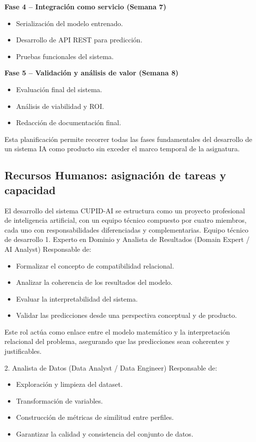 \textbf{Fase 4 – Integración como servicio (Semana 7)}
\begin{itemize}
    \item Serialización del modelo entrenado.
    \item Desarrollo de API REST para predicción.
    \item Pruebas funcionales del sistema.
\end{itemize}

\textbf{Fase 5 – Validación y análisis de valor (Semana 8)}
\begin{itemize}
    \item Evaluación final del sistema.
    \item Análisis de viabilidad y ROI.
    \item Redacción de documentación final.
\end{itemize}

Esta planificación permite recorrer todas las fases fundamentales del desarrollo de un sistema IA como producto sin exceder el marco temporal de la asignatura.

\subsection{Recursos Humanos: asignación de tareas y capacidad}
El desarrollo del sistema CUPID-AI se estructura como un proyecto profesional de inteligencia artificial, con un equipo técnico compuesto por cuatro miembros, cada uno con responsabilidades diferenciadas y complementarias.
Equipo técnico de desarrollo
1. Experto en Dominio y Analista de Resultados (Domain Expert / AI Analyst)
 Responsable de:
\begin{itemize}
    \item Formalizar el concepto de compatibilidad relacional.
    \item Analizar la coherencia de los resultados del modelo.
    \item Evaluar la interpretabilidad del sistema.
    \item Validar las predicciones desde una perspectiva conceptual y de producto.
\end{itemize}
Este rol actúa como enlace entre el modelo matemático y la interpretación relacional del problema, asegurando que las predicciones sean coherentes y justificables.

2. Analista de Datos (Data Analyst / Data Engineer)
 Responsable de:
\begin{itemize}
    \item Exploración y limpieza del dataset.
    \item Transformación de variables.
    \item Construcción de métricas de similitud entre perfiles.
    \item Garantizar la calidad y consistencia del conjunto de datos.
\end{itemize}


